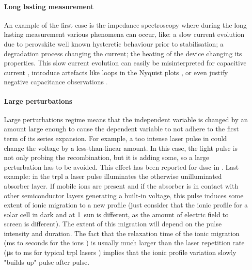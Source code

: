 		\paragraph{Long lasting measurement}
		An example of the first case is the impedance spectroscopy where during the long lasting measurement various phenomena can occur, like: a slow current evolution due to perovskite well known hysteretic behaviour prior to stabilisation; a degradation process changing the current; the heating of the device changing its properties.
		This slow current evolution can easily be misinterpreted for capacitive current \cite{Jacobs2018}, introduce artefacts like loops in the Nyquist plots \cite{Moia2019}, or even justify negative capacitance observations \cite{Knapp2015}.

		\paragraph{Large perturbations} \label{perturbation}
		Large perturbations regime means that the independent variable is changed by an amount large enough to cause the dependent variable to not adhere to the first term of its series expansion.
		For example, a too intense laser pulse in  could change the voltage by a less\hyp{}than\hyp{}linear amount.
		In this case, the light pulse is not only probing the recombination, but it is adding some, so a large perturbation has to be avoided.
		This effect has been reported for \gls{dssc} in .
		Last example: in the \glsdesc{trpl} a laser pulse illuminates the otherwise unilluminated absorber layer.
		If mobile ions are present and if the absorber is in contact with other semiconductor layers generating a built-in voltage, this pulse induces some extent of ionic migration to a new profile \cite{Levine2018} (just consider that the ionic profile for a solar cell in dark and at \SI{1}{sun} is different, as the amount of electric field to screen is different).
		The extent of this migration will depend on the pulse intensity and duration.
		The fact that the relaxation time of the ionic migration (\si{\ms} to seconds for the ions \cite{Jacobs2018}) is usually much larger than the laser repetition rate (\si{\us} to \si{\ms} for typical \gls{trpl} lasers \cite{EdinburghInstruments}) implies that the ionic profile variation slowly "builds up" pulse after pulse.
